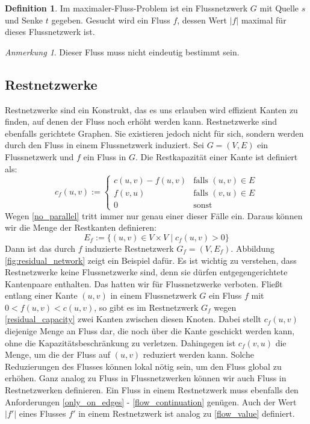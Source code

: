 \documentclass[12pt,a4paper,titlepage,onecolumn,ngerman,bibliography=totocnumbered]{scrartcl}
\theoremstyle{definition}
\newtheorem*{definition}{Definition}
\theoremstyle{remark}
\newtheorem*{remark}{Anmerkung}
\begin{document}
\begin{definition}
	Im maximaler-Fluss-Problem ist ein Flussnetzwerk $G$ mit Quelle $s$ und Senke $t$ gegeben.
	Gesucht wird ein Fluss $f$, dessen Wert $\lvert f\rvert$ maximal für dieses Flussnetzwerk ist.
\end{definition}
\begin{remark}
	Dieser Fluss muss nicht eindeutig bestimmt sein. %
\end{remark}

\subsection{Restnetzwerke}
Restnetzwerke sind ein Konstrukt, das es uns erlauben wird effizient Kanten zu finden, auf denen der Fluss noch erhöht werden kann.
Restnetzwerke sind ebenfalls gerichtete Graphen.
Sie existieren jedoch nicht für sich, sondern werden durch den Fluss in einem Flussnetzwerk induziert.
\medbreak
Sei $G=(V,E)$ ein Flussnetzwerk und $f$ ein Fluss in $G$.
Die Restkapazität einer Kante ist definiert als:
\begin{equation}\label{residual_capacity}
	c_{f}(u,v) :=
	\begin{cases}
		c(u,v) - f(u,v) & \text{falls $(u,v)\in E$}  \\
		f(v,u)          & \text{falls $(v,u) \in E$} \\
		0               & \text{sonst}
	\end{cases}
\end{equation}
Wegen \eqref{no_parallel} tritt immer nur genau einer dieser Fälle ein.
Daraus können wir die Menge der Restkanten definieren:
\begin{equation}\label{residual_edges}
	E_f := \{ (u,v) \in V \times V \mid c_{f}(u,v) > 0\}
\end{equation}
Dann ist das durch $f$ induzierte Restnetzwerk $G_f=(V,E_f)$.
Abbildung \ref{fig:residual_network} zeigt ein Beispiel dafür.
\bigbreak
Es ist wichtig zu verstehen, dass Restnetzwerke keine Flussnetzwerke sind, denn sie dürfen entgegengerichtete Kantenpaare enthalten.
Das hatten wir für Flussnetzwerke verboten.
Fließt entlang einer Kante $(u,v)$ in einem Flussnetzwerk $G$ ein Fluss $f$ mit $0 < f(u,v) < c(u,v)$, so gibt es im Restnetzwerk $G_f$ wegen \eqref{residual_capacity} zwei Kanten zwischen diesen Knoten.
Dabei stellt $c_f(u,v)$ diejenige Menge an Fluss dar, die noch über die Kante geschickt werden kann, ohne die Kapazitätsbeschränkung zu verletzen.
Dahingegen ist $c_f(v,u)$ die Menge, um die der Fluss auf $(u,v)$ reduziert werden kann.
Solche Reduzierungen des Flusses können lokal nötig sein, um den Fluss global zu erhöhen.
\bigbreak
Ganz analog zu Fluss in Flussnetzwerken können wir auch Fluss in Restnetzwerken definieren.
Ein Fluss in einem Restnetzwerk muss ebenfalls den Anforderungen \eqref{only_on_edges} - \eqref{flow_continuation} genügen.
Auch der Wert $\lvert f'\rvert$ eines Flusses $f'$ in einem Restnetzwerk ist analog zu \eqref{flow_value} definiert.
\end{document}
